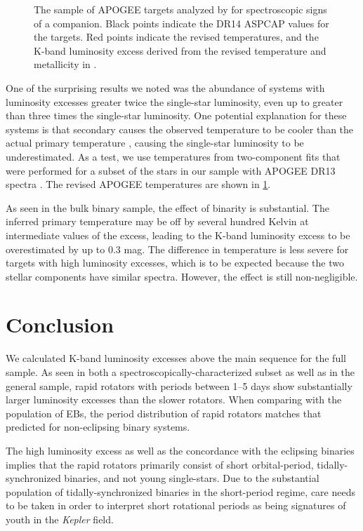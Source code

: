\documentclass[manuscript]{aastex6}
\newcommand{\Kepler}{\mbox{\textit{Kepler}}}
\begin{document}
\begin{figure}[htb]
    \centering
    \caption{The sample of APOGEE targets analyzed by \citet{ElBadry18b} for
    spectroscopic signs of a companion. Black points indicate the DR14 ASPCAP
values for the targets. Red points indicate the revised temperatures, and the
K-band luminosity excess derived from the revised temperature and metallicity
in \citet{ElBadry18b}.}
    \label{fig:elbadry_excess}
\end{figure}

One of the surprising results we noted was the abundance of systems with
luminosity excesses greater twice the single-star luminosity, even up to
greater than three times the single-star luminosity. One potential
explanation for these systems is that secondary causes the observed temperature
to be cooler than the actual primary temperature \citep{ElBadry18a}, causing the single-star
luminosity to be underestimated. As a test, we use temperatures from
two-component fits that were performed for a subset of the stars in our sample
with APOGEE DR13 spectra \citep{ElBadry18b}. The revised APOGEE temperatures are
shown in \cref{fig:elbadry_excess}.

As seen in the bulk binary sample, the effect of binarity is substantial. The
inferred primary temperature may be off by several hundred Kelvin at
intermediate values of the excess, leading to the K-band luminosity excess to
be overestimated by up to 0.3 mag. The difference in temperature is less severe
for targets with high luminosity excesses, which is to be expected because the
two stellar components have similar spectra. However, the effect is still
non-negligible.

\section{Conclusion}
\label{sec:conclusions}

We calculated K-band luminosity excesses above the main sequence for the full
\citet{McQuillan14} sample. As seen in both a spectroscopically-characterized
subset as well as in the general sample, rapid rotators with periods between
1--5 days show substantially larger luminosity excesses than the slower
rotators. When comparing with the population of EBs, the period distribution of
rapid rotators matches that predicted for non-eclipsing binary systems.

The high luminosity excess as well as the concordance with the eclipsing
binaries implies that the rapid rotators primarily consist of short
orbital-period, tidally-synchronized binaries, and not young
single-stars. Due to the substantial population of tidally-synchronized
binaries in the short-period regime, care needs to be taken in order to
interpret short rotational periods as being signatures of youth in the
\Kepler{} field.



\end{document}
